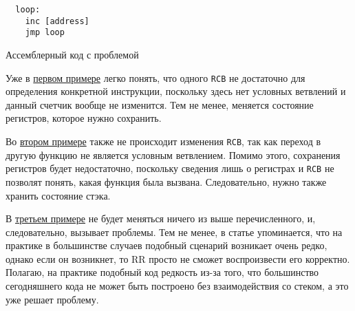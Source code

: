 \begin{codelisting}[H]
\begin{verbatim}
  loop:
    inc [address]
    jmp loop
\end{verbatim}
  \caption{Ассемблерный код с проблемой}
  \label{lst:bad-loop}
\end{codelisting}

Уже в \hyperref[lst:good-loop]{первом примере} легко понять, что одного \texttt{RCB} не достаточно для определения конкретной инструкции, 
поскольку здесь нет условных ветвлений и данный счетчик вообще не изменится. Тем не менее, меняется состояние регистров, которое нужно сохранить.

Во \hyperref[lst:multiple-calls]{втором примере} также не происходит изменения \texttt{RCB}, 
так как переход в другую функцию не является условным ветвлением.
Помимо этого, сохранения регистров будет недостаточно, поскольку сведения лишь о регистрах и \texttt{RCB} не позволят понять, какая функция была вызвана.
Следовательно, нужно также хранить состояние стэка.

В \hyperref[lst:bad-loop]{третьем примере} не будет меняться ничего из выше перечисленного, и, следовательно, вызывает проблемы. 
Тем не менее, в статье \cite{rr-paper} упоминается, что на практике в большинстве случаев подобный сценарий возникает очень редко, 
однако если он возникнет, то RR просто не сможет воспроизвести его корректно.
Полагаю, на практике подобный код редкость из-за того, что большинство сегодняшнего кода не может быть построено без взаимодействия со стеком, а это уже решает проблему.
